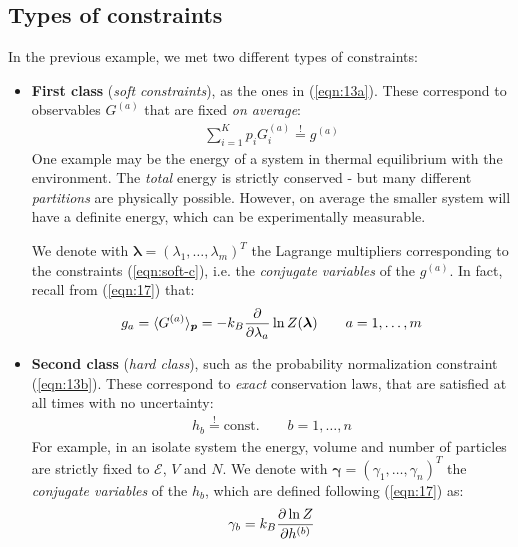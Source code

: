 \documentclass[../../main.tex]{subfiles}
\begin{document}
\subsection{Types of constraints}
In the previous example, we met two different types of constraints:
\begin{itemize}
    \item \textbf{First class} (\textit{soft constraints}), as the ones in (\ref{eqn:13a}). These correspond to observables $G^{(a)}$ that are fixed \textit{on average}:
    \begin{align}\label{eqn:soft-c}
        \sum_{i=1}^K p_i G_i^{(a)} \overset{!}{=} g^{(a)}
    \end{align}
    One example may be the energy of a system in thermal equilibrium with the environment. The \textit{total} energy is strictly conserved - but many different \textit{partitions} are physically possible. However, on average the smaller system will have a definite energy, which can be experimentally measurable.  

    We denote with $\bm{\lambda} = (\lambda_1,\dots, \lambda_m)^T$ the Lagrange multipliers corresponding to the constraints (\ref{eqn:soft-c}), i.e. the \textit{conjugate variables} of the $g^{(a)}$. In fact, recall from (\ref{eqn:17}) that:
    \begin{align}
        g_a = \langle G^{(a)} \rangle_{\bm{p}} = -k_B \pdv{\lambda_a} \ln Z(\bm{\lambda}) \qquad a = 1,\dots,m
    \end{align}

    \item \textbf{Second class} (\textit{hard class}), such as the probability normalization constraint (\ref{eqn:13b}). These correspond to \textit{exact} conservation laws, that are satisfied at all times with no uncertainty:
    \begin{align}\label{eqn:hard-c}
        h_b \overset{!}{=} \text{const.} \qquad b=1,\dots,n
    \end{align}
    For example, in an isolate system the energy, volume and number of particles are strictly fixed to $\mathcal{E}$, $V$ and $N$. We denote with $\bm{\gamma} = (\gamma_1, \dots, \gamma_n)^T$ the \textit{conjugate variables} of the $h_b$, which are defined following (\ref{eqn:17}) as:
    \begin{align}\label{eqn:21}
        \gamma_b = k_B \pdv{\ln Z}{h^{(b)}}
    \end{align}
\end{itemize}
\end{document}
